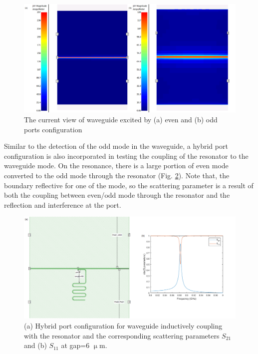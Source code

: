 \documentclass[noshowpacs,amsmath,
superscriptaddress,
10pt]{article}
\begin{document}
\begin{figure}[!ht]
\centering
\includegraphics[width=16cm] {Even_waveguide}
\caption{The current view of waveguide excited by (a) even and (b) odd ports configuration}
\label{pic:Even_waveguide}
\end{figure}

Similar to the detection of the odd mode in the waveguide, a hybrid port configuration is also incorporated in testing the coupling of the resonator to the waveguide mode. On the resonance, there is a large portion of even mode converted to the odd mode through the resonator (Fig. \ref{pic:Hybd_geo}). Note that, the boundary reflective for one of the mode, so the scattering parameter is a result of both the coupling between even/odd mode through the resonator and the reflection and interference at the port.

\begin{figure}[!ht]
\centering
\includegraphics[width=16cm] {Hybd_geo}
\caption{(a) Hybrid port configuration for waveguide inductively coupling with the resonator and the corresponding scattering parameters $S_{21}$ and (b) $S_{11}$ at gap=6 $\upmu$m.}
\label{pic:Hybd_geo}
\end{figure}
\end{document}

